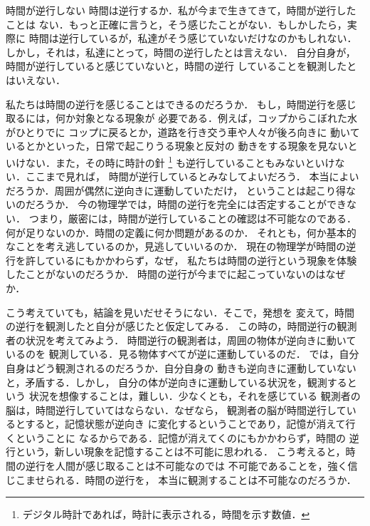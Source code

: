             \begin{memo}{時間が逆行しない}
                時間は逆行するか．私が今まで生きてきて，時間が逆行したことは
                ない．もっと正確に言うと，そう感じたことがない．もしかしたら，実際に
                時間は逆行しているが，私達がそう感じていないだけなのかもしれない．
                しかし，それは，私達にとって，時間の逆行したとは言えない．
                自分自身が，時間が逆行していると感じていないと，時間の逆行
                していることを観測したとはいえない．

                私たちは時間の逆行を感じることはできるのだろうか．
                もし，時間逆行を感じ取るには，何か対象となる現象が
                必要である．例えば，コップからこぼれた水がひとりでに
                コップに戻るとか，道路を行き交う車や人々が後ろ向きに
                動いているとかといった，日常で起こりうる現象と反対の
                動きをする現象を見ないといけない．また，その時に時計の針
                    \footnote{
                        デジタル時計であれば，時計に表示される，時間を示す数値．
                    }
                も逆行していることもみないといけない．ここまで見れば，
                時間が逆行しているとみなしてよいだろう．
                本当によいだろうか．周囲が偶然に逆向きに運動していただけ，
                ということは起こり得ないのだろうか．
                今の物理学では，時間の逆行を完全には否定することができない．
                つまり，厳密には，時間が逆行していることの確認は不可能なのである．
                何が足りないのか．時間の定義に何か問題があるのか．
                それとも，何か基本的なことを考え逃しているのか，見逃していいるのか．
                現在の物理学が時間の逆行を許しているにもかかわらず，なぜ，
                私たちは時間の逆行という現象を体験したことがないのだろうか．
                時間の逆行が今までに起こっていないのはなぜか．

                こう考えていても，結論を見いだせそうにない．そこで，発想を
                変えて，時間の逆行を観測したと自分が感じたと仮定してみる．
                この時の，時間逆行の観測者の状況を考えてみよう．
                時間逆行の観測者は，周囲の物体が逆向きに動いているのを
                観測している．見る物体すべてが逆に運動しているのだ．
                では，自分自身はどう観測されるのだろうか．自分自身の
                動きも逆向きに運動していないと，矛盾する．しかし，
                自分の体が逆向きに運動している状況を，観測するという
                状況を想像することは，難しい．少なくとも，それを感じている
                観測者の脳は，時間逆行していてはならない．なぜなら，
                観測者の脳が時間逆行しているとすると，記憶状態が逆向き
                に変化するということであり，記憶が消えて行くということに
                なるからである．記憶が消えてくのにもかかわらず，時間の
                逆行という，新しい現象を記憶することは不可能に思われる．
                こう考えると，時間の逆行を人間が感じ取ることは不可能なのでは
                不可能であることを，強く信じこませられる．時間の逆行を，
                本当に観測することは不可能なのだろうか．
            \end{memo}

